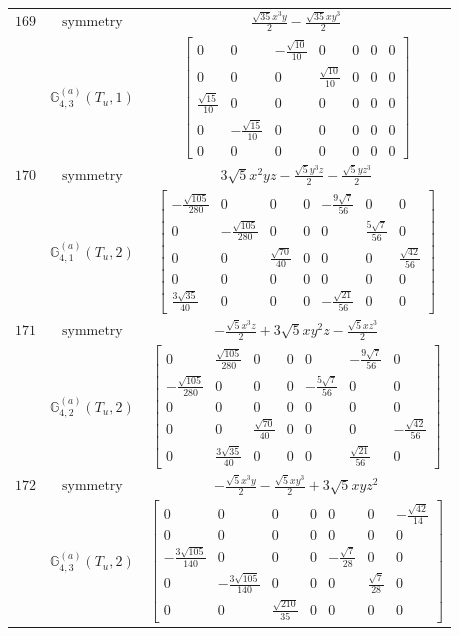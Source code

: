 \documentclass[fleqn,8pt,landscape]{jsarticle}
\begin{document}
\begin{longtable}{ccc}
$ 169 $ & $ \text{symmetry} $ & $ \frac{\sqrt{35} x^{3} y}{2} - \frac{\sqrt{35} x y^{3}}{2} $ \\
$  $ & $ \mathbb{G}_{4,3}^{(a)}(T_{u},1) $ & $ \begin{bmatrix} 0 & 0 & - \frac{\sqrt{10}}{10} & 0 & 0 & 0 & 0 \\ 0 & 0 & 0 & \frac{\sqrt{10}}{10} & 0 & 0 & 0 \\ \frac{\sqrt{15}}{10} & 0 & 0 & 0 & 0 & 0 & 0 \\ 0 & - \frac{\sqrt{15}}{10} & 0 & 0 & 0 & 0 & 0 \\ 0 & 0 & 0 & 0 & 0 & 0 & 0 \end{bmatrix} $ \\ \hline
$ 170 $ & $ \text{symmetry} $ & $ 3 \sqrt{5} x^{2} y z - \frac{\sqrt{5} y^{3} z}{2} - \frac{\sqrt{5} y z^{3}}{2} $ \\
$  $ & $ \mathbb{G}_{4,1}^{(a)}(T_{u},2) $ & $ \begin{bmatrix} - \frac{\sqrt{105}}{280} & 0 & 0 & 0 & - \frac{9 \sqrt{7}}{56} & 0 & 0 \\ 0 & - \frac{\sqrt{105}}{280} & 0 & 0 & 0 & \frac{5 \sqrt{7}}{56} & 0 \\ 0 & 0 & \frac{\sqrt{70}}{40} & 0 & 0 & 0 & \frac{\sqrt{42}}{56} \\ 0 & 0 & 0 & 0 & 0 & 0 & 0 \\ \frac{3 \sqrt{35}}{40} & 0 & 0 & 0 & - \frac{\sqrt{21}}{56} & 0 & 0 \end{bmatrix} $ \\ \hline
$ 171 $ & $ \text{symmetry} $ & $ - \frac{\sqrt{5} x^{3} z}{2} + 3 \sqrt{5} x y^{2} z - \frac{\sqrt{5} x z^{3}}{2} $ \\
$  $ & $ \mathbb{G}_{4,2}^{(a)}(T_{u},2) $ & $ \begin{bmatrix} 0 & \frac{\sqrt{105}}{280} & 0 & 0 & 0 & - \frac{9 \sqrt{7}}{56} & 0 \\ - \frac{\sqrt{105}}{280} & 0 & 0 & 0 & - \frac{5 \sqrt{7}}{56} & 0 & 0 \\ 0 & 0 & 0 & 0 & 0 & 0 & 0 \\ 0 & 0 & \frac{\sqrt{70}}{40} & 0 & 0 & 0 & - \frac{\sqrt{42}}{56} \\ 0 & \frac{3 \sqrt{35}}{40} & 0 & 0 & 0 & \frac{\sqrt{21}}{56} & 0 \end{bmatrix} $ \\ \hline
$ 172 $ & $ \text{symmetry} $ & $ - \frac{\sqrt{5} x^{3} y}{2} - \frac{\sqrt{5} x y^{3}}{2} + 3 \sqrt{5} x y z^{2} $ \\
$  $ & $ \mathbb{G}_{4,3}^{(a)}(T_{u},2) $ & $ \begin{bmatrix} 0 & 0 & 0 & 0 & 0 & 0 & - \frac{\sqrt{42}}{14} \\ 0 & 0 & 0 & 0 & 0 & 0 & 0 \\ - \frac{3 \sqrt{105}}{140} & 0 & 0 & 0 & - \frac{\sqrt{7}}{28} & 0 & 0 \\ 0 & - \frac{3 \sqrt{105}}{140} & 0 & 0 & 0 & \frac{\sqrt{7}}{28} & 0 \\ 0 & 0 & \frac{\sqrt{210}}{35} & 0 & 0 & 0 & 0 \end{bmatrix} $ \\ \hline

\end{longtable}
\end{document}
